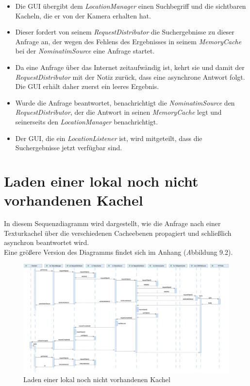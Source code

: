 \documentclass[10pt]{scrreprt}
\newcommand{\textref}[1]{\mbox{\raisebox{0.1ex}{\small$\rightarrow$ }\textit{#1}}}
\begin{document}
\begin{itemize}
\item Die GUI übergibt dem \textit{LocationManager} einen Suchbegriff und die sichtbaren Kacheln, die er von der Kamera erhalten hat.
\item Dieser fordert von seinem \textit{RequestDistributor} die Suchergebnisse zu dieser Anfrage an, der wegen des Fehlens des Ergebnisses in seinem \textit{MemoryCache} bei der \textit{NominatimSource} eine Anfrage startet. 
\item Da eine Anfrage über das Internet zeitaufwändig ist, kehrt sie und damit der \textit{RequestDistributor} mit der Notiz zurück, dass eine asynchrone Antwort folgt. Die GUI erhält daher zuerst ein leeres Ergebnis.
\item Wurde die Anfrage beantwortet, benachrichtigt die \textit{NominatimSource} den \textit{RequestDistributor}, der die Antwort in seinen \textit{MemoryCache} legt und seinerseits den \textit{LocationManager} benachrichtigt.
\item Der GUI, die ein \textit{LocationListener} ist, wird mitgeteilt, dass die Suchergebnisse jetzt verfügbar sind.
\end{itemize}
\newpage


\section{Laden einer lokal noch nicht vorhandenen Kachel}

In diesem Sequenzdiagramm wird dargestellt, wie die Anfrage nach einer Texturkachel über die verschiedenen Cacheebenen propagiert und schließlich asynchron beantwortet wird.\\[3mm]
Eine größere Version des Diagramms findet sich im Anhang (\textref Abbildung 9.2).

\vspace*{5mm}
\begin{figure}[h]
\begin{center}
\includegraphics[scale=0.28]{sequenz-osmtile.eps}
\caption{Laden einer lokal noch nicht vorhandenen Kachel}
\end{center}
\end{figure}
\end{document}
